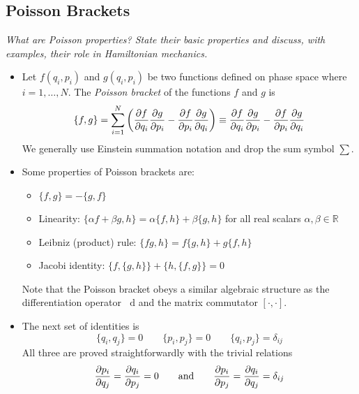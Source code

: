 \documentclass[11pt, a4paper]{article}
\newcommand{\eqtext}[1]{\qquad \text{#1} \qquad}
\newcommand{\diff}{\mathop{}\!\mathrm{d}} %
\newcommand{\R}{\mathbb{R}} %
\begin{document}
\subsection{Poisson Brackets}
\textit{What are Poisson properties? State their basic properties and discuss, with examples, their role in Hamiltonian mechanics.}

\begin{itemize}
	\item Let $ f(q_{i}, p_{i}) $ and $ g(q_{i}, p_{i}) $ be two functions defined on phase space where $ i = 1, \ldots, N $. The \textit{Poisson bracket} of the functions $ f $ and $ g $ is 
	\begin{equation*}
		\{f, g\} = \sum_{i=1}^{N}\left(\pdv{f}{q_{i}} \pdv{g}{p_{i}} - \pdv{f}{p_{i}} \pdv{g}{q_{i}}\right) \equiv \pdv{f}{q_{i}} \pdv{g}{p_{i}} - \pdv{f}{p_{i}} \pdv{g}{q_{i}}
	\end{equation*}
	We generally use Einstein summation notation and drop the sum symbol $ \sum $.
	
	\item Some properties of Poisson brackets are:
	\begin{itemize}
		\item $ \{f, g\} = - \{g, f\} $
		\item Linearity: $ \{\alpha f + \beta g, h \} = \alpha \{f, h \}  + \beta \{g, h \} $ for all real scalars $ \alpha, \beta \in \R $
		\item Leibniz (product) rule: $ \{fg, h\} = f\{g, h\} + g\{f, h\} $
		\item Jacobi identity: $ \{f, \{g, h\} \}  + \{h, \{f, g\} \} = 0 $ 
	\end{itemize}
	Note that the Poisson bracket obeys a similar algebraic structure as the differentiation operator $ \diff $ and the matrix commutator $ [\cdot, \cdot] $.
	
	\item The next set of identities is
	\begin{equation*}
		\{q_{i}, q_{j}\} = 0 \qquad \{p_{i}, p_{j}\} = 0 \qquad \{q_{i}, p_{j}\} = \delta_{ij}
	\end{equation*}
	All three are proved straightforwardly with the trivial relations
	\begin{equation*}
		\pdv{p_{i}}{q_{j}} = \pdv{q_{i}}{p_{j}} = 0  \eqtext{and} \pdv{p_{i}}{p_{j}} = \pdv{q_{i}}{q_{j}} = \delta_{i j} 
	\end{equation*}


\end{itemize}
\end{document}

